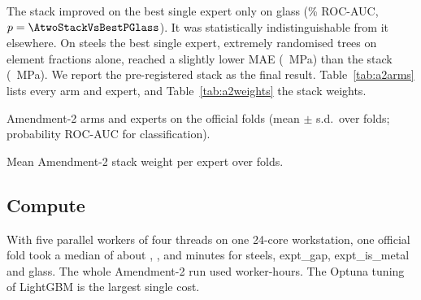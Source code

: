The stack improved on the best single expert only on glass (\AtwoStackVsBestGlass\% ROC-AUC, $p=\AtwoStackVsBestPGlass$). It was statistically indistinguishable from it elsewhere.
On steels the best single expert, extremely randomised trees on element fractions alone, reached a slightly lower MAE (\AtwoBestSteels~MPa) than the stack (\AtwoStackSteels~MPa). We report the pre-registered stack as the final result.
Table~\ref{tab:a2arms} lists every arm and expert, and Table~\ref{tab:a2weights} the stack weights.

\begin{table}[t]
\centering
\caption{Amendment-2 arms and experts on the official folds (mean $\pm$ s.d.\ over folds; probability ROC-AUC for classification).}
\label{tab:a2arms}
\begin{adjustbox}{max width=\textwidth}

\end{adjustbox}
\end{table}

\begin{table}[t]
\centering
\caption{Mean Amendment-2 stack weight per expert over folds.}
\label{tab:a2weights}
\begin{adjustbox}{max width=\textwidth}

\end{adjustbox}
\end{table}

\subsection{Compute}
With five parallel workers of four threads on one 24-core workstation, one official fold took a median of about \AtwoWallMinSteels, \AtwoWallMinGap, \AtwoWallMinMetal{} and \AtwoWallMinGlass{} minutes for steels, expt\_gap, expt\_is\_metal and glass. The whole Amendment-2 run used \AtwoTotalJobHours{} worker-hours.
The Optuna tuning of LightGBM is the largest single cost.
